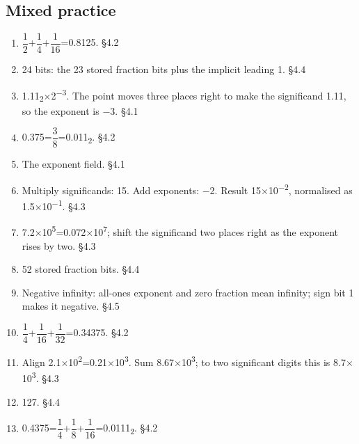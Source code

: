 \documentclass[11pt]{article}
\begin{document}
\begin{keepsection}\subsection{Mixed practice}

\begin{enumerate}
\item {\small\ensuremath{\dfrac{1}{2}}}+{\small\ensuremath{\dfrac{1}{4}}}+{\small\ensuremath{\dfrac{1}{16}}}=0.8125. \hfill{\small\color{FAUblue}§4.2}
\item 24 bits: the 23 stored fraction bits plus the implicit leading 1. \hfill{\small\color{FAUblue}§4.4}
\item 1.11\textsubscript{2}\ensuremath{\times}2\textsuperscript{\ensuremath{-}3}. The point moves three places right to make the significand 1.11, so the exponent is \ensuremath{-}3. \hfill{\small\color{FAUblue}§4.1}
\item 0.375={\small\ensuremath{\dfrac{3}{8}}}=0.011\textsubscript{2}. \hfill{\small\color{FAUblue}§4.2}
\item The exponent field. \hfill{\small\color{FAUblue}§4.1}
\item Multiply significands: 15. Add exponents: \ensuremath{-}2. Result 15\ensuremath{\times}10\textsuperscript{\ensuremath{-}2}, normalised as 1.5\ensuremath{\times}10\textsuperscript{\ensuremath{-}1}. \hfill{\small\color{FAUblue}§4.3}
\item 7.2\ensuremath{\times}10\textsuperscript{5}=0.072\ensuremath{\times}10\textsuperscript{7}; shift the significand two places right as the exponent rises by two. \hfill{\small\color{FAUblue}§4.3}
\item 52 stored fraction bits. \hfill{\small\color{FAUblue}§4.4}
\item Negative infinity: all-ones exponent and zero fraction mean infinity; sign bit 1 makes it negative. \hfill{\small\color{FAUblue}§4.5}
\item {\small\ensuremath{\dfrac{1}{4}}}+{\small\ensuremath{\dfrac{1}{16}}}+{\small\ensuremath{\dfrac{1}{32}}}=0.34375. \hfill{\small\color{FAUblue}§4.2}
\item Align 2.1\ensuremath{\times}10\textsuperscript{2}=0.21\ensuremath{\times}10\textsuperscript{3}. Sum 8.67\ensuremath{\times}10\textsuperscript{3}; to two significant digits this is 8.7\ensuremath{\times}10\textsuperscript{3}. \hfill{\small\color{FAUblue}§4.3}
\item 127. \hfill{\small\color{FAUblue}§4.4}
\item 0.4375={\small\ensuremath{\dfrac{1}{4}}}+{\small\ensuremath{\dfrac{1}{8}}}+{\small\ensuremath{\dfrac{1}{16}}}=0.0111\textsubscript{2}. \hfill{\small\color{FAUblue}§4.2}

\end{enumerate}
\end{keepsection}
\end{document}
